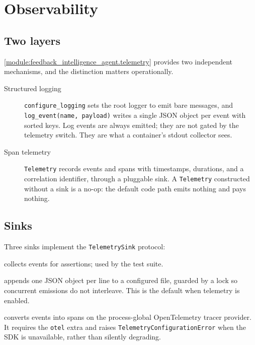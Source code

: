 
\chapter{Observability}
\label{ch:observability}

\section{Two layers}

\cref{module:feedback_intelligence_agent.telemetry} provides two independent
mechanisms, and the distinction matters operationally.

\begin{description}
  \item[Structured logging] \texttt{configure\_logging} sets the root logger to
    emit bare messages, and \texttt{log\_event(name, payload)} writes a single
    JSON object per event with sorted keys. Log events are always emitted; they
    are not gated by the telemetry switch. They are what a container's stdout
    collector sees.
  \item[Span telemetry] \texttt{Telemetry} records events and spans with
    timestamps, durations, and a correlation identifier, through a pluggable
    sink. A \texttt{Telemetry} constructed without a sink is a no-op: the
    default code path emits nothing and pays nothing.
\end{description}

\section{Sinks}

Three sinks implement the \texttt{TelemetrySink} protocol:

\begin{description}[nosep]
  \item[\texttt{InMemoryTelemetrySink}] collects events for assertions; used by
    the test suite.
  \item[\texttt{JsonlTelemetrySink}] appends one JSON object per line to a
    configured file, guarded by a lock so concurrent emissions do not
    interleave. This is the default when telemetry is enabled.
  \item[\texttt{OpenTelemetryTraceSink}] converts events into spans on the
    process-global OpenTelemetry tracer provider. It requires the \texttt{otel}
    extra and raises \texttt{TelemetryConfigurationError} when the SDK is
    unavailable, rather than silently degrading.
\end{description}

